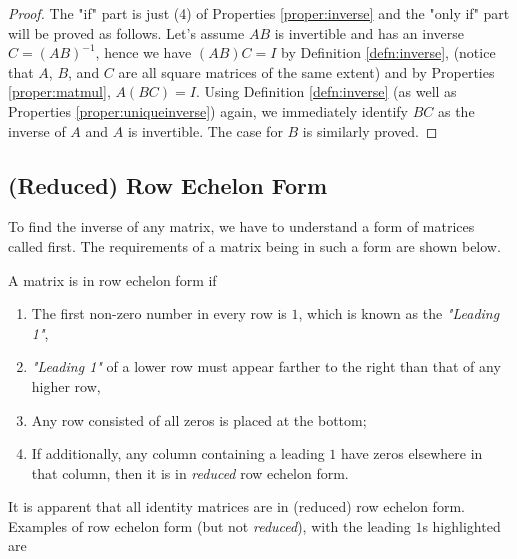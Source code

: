 \begin{proof}
The "if" part is just (4) of Properties \ref{proper:inverse} and the "only if" part will be proved as follows. Let's assume $AB$ is invertible and has an inverse $C = (AB)^{-1}$, hence we have $(AB)C = I$ by Definition \ref{defn:inverse}, (notice that $A$, $B$, and $C$ are all square matrices of the same extent) and by Properties \ref{proper:matmul}, $A(BC) = I$. Using Definition \ref{defn:inverse} (as well as Properties \ref{proper:uniqueinverse}) again, we immediately identify $BC$ as the inverse of $A$ and $A$ is invertible. The case for $B$ is similarly proved.
\end{proof}

\subsection{(Reduced) Row Echelon Form}
\label{Echelon}
To find the inverse of any matrix, we have to understand a form of matrices called  first. The requirements of a matrix being in such a form are shown below.
\begin{defn}
A matrix is in row echelon form if
\begin{enumerate}
\item The first non-zero number in every row is $1$, which is known as the \textit{"Leading 1"},
\item \textit{"Leading 1"} of a lower row must appear farther to the right than that of any higher row,
\item Any row consisted of all zeros is placed at the bottom;
\item If additionally, any column containing a leading $1$ have zeros elsewhere in that column, then it is in \textit{reduced} row echelon form.
\end{enumerate}
\end{defn}
It is apparent that all identity matrices are in (reduced) row echelon form. Examples of row echelon form (but not \textit{reduced}), with the leading $1$s highlighted are
